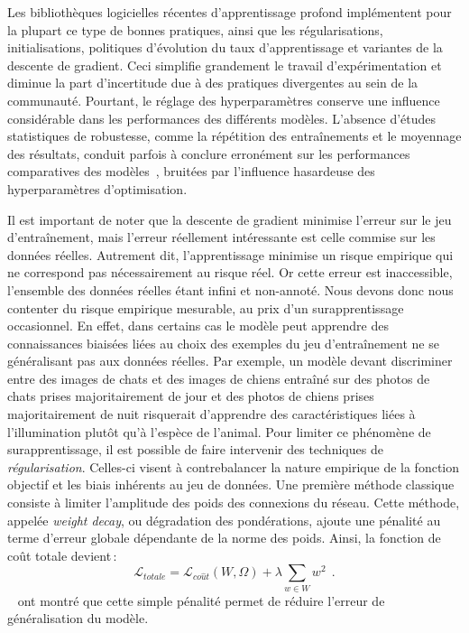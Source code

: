 Les bibliothèques logicielles récentes d'apprentissage profond implémentent pour la plupart ce type de bonnes pratiques, ainsi que les régularisations, initialisations, politiques d'évolution du taux d'apprentissage et variantes de la descente de gradient. Ceci simplifie grandement le travail d'expérimentation et diminue la part d'incertitude due à des pratiques divergentes au sein de la communauté. Pourtant, le réglage des hyperparamètres conserve une influence considérable dans les performances des différents modèles. L'absence d'études statistiques de robustesse, comme la répétition des entraînements et le moyennage des résultats, conduit parfois à conclure erronément sur les performances comparatives des modèles~\cite{oliver_realistic_2018}, bruitées par l'influence hasardeuse des hyperparamètres d'optimisation.

Il est important de noter que la descente de gradient minimise l'erreur sur le jeu d'entraînement, mais l'erreur réellement intéressante est celle commise sur les données réelles. Autrement dit, l'apprentissage minimise un risque empirique qui ne correspond pas nécessairement au risque réel. Or cette erreur est inaccessible, l'ensemble des données réelles étant infini et non-annoté. Nous devons donc nous contenter du risque empirique mesurable, au prix d'un surapprentissage occasionnel. En effet, dans certains cas le modèle peut apprendre des connaissances biaisées liées au choix des exemples du jeu d'entraînement ne se généralisant pas aux données réelles. Par exemple, un modèle devant discriminer entre des images de chats et des images de chiens entraîné sur des photos de chats prises majoritairement de jour et des photos de chiens prises majoritairement de nuit risquerait d'apprendre des caractéristiques liées à l'illumination plutôt qu'à l'espèce de l'animal.
Pour limiter ce phénomène de surapprentissage, il est possible de faire intervenir des techniques de \emph{régularisation}. Celles-ci visent à contrebalancer la nature empirique de la fonction objectif et les biais inhérents au jeu de données. Une première méthode classique consiste à limiter l'amplitude des poids des connexions du réseau. Cette méthode, appelée \emph{weight decay}, ou dégradation des pondérations, ajoute une pénalité au terme d'erreur globale dépendante de la norme des poids. Ainsi, la fonction de coût totale devient\,:
$$\mathcal{L}_{totale} = \mathcal{L}_{co\hat{u}t}(W, \Omega) + \lambda \sum_{w \in W} w^2~~.$$
~\citet{krogh_simple_1991} ont montré que cette simple pénalité permet de réduire l'erreur de généralisation du modèle.

